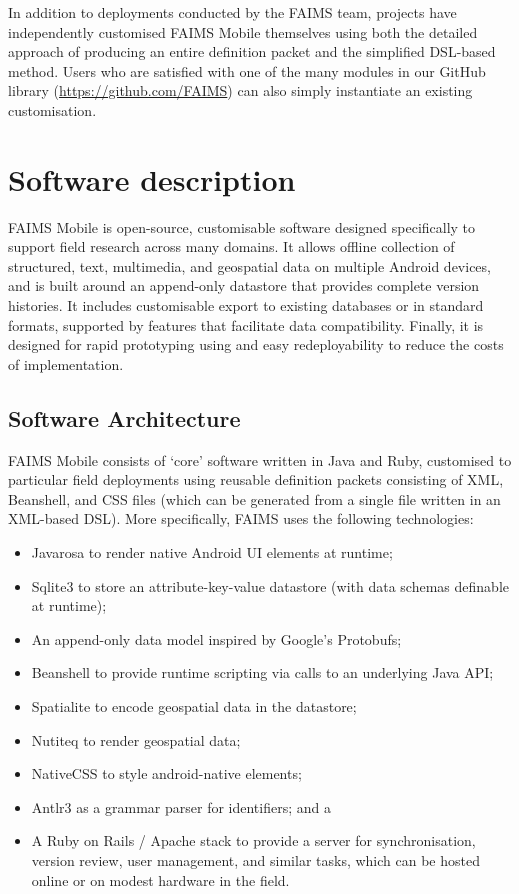 \documentclass[preprint,12pt, a4paper]{elsarticle}
\begin{document}
In addition to deployments conducted by the FAIMS team, projects have independently customised FAIMS Mobile themselves using both the detailed approach of producing an entire definition packet and the simplified DSL-based method\cite{Good2016-gf, Kiley2016-sf}. Users who are satisfied with one of the many modules in our GitHub library (\url{https://github.com/FAIMS}) can also simply instantiate an existing customisation.

\section{Software description}


FAIMS Mobile is open-source, customisable software designed specifically to support field research across many domains. It allows offline collection of structured, text, multimedia, and geospatial data on multiple Android devices, and is built around an append-only datastore that provides complete version histories. It includes customisable export to existing databases or in standard formats, supported by features that facilitate data compatibility. Finally, it is designed for rapid prototyping using and easy redeployability to reduce the costs of implementation. 


\subsection{Software Architecture}



FAIMS Mobile consists of `core' software written in Java and Ruby, customised to particular field deployments using reusable definition packets consisting of XML, Beanshell, and CSS files (which can be generated from a single file written in an XML-based DSL). More specifically, FAIMS uses the following technologies:

\begin{itemize}
\item Javarosa to render native Android UI elements at runtime;
\item Sqlite3 to store an attribute-key-value datastore (with data schemas definable at runtime);
\item An append-only data model inspired by Google's Protobufs;
\item Beanshell to provide runtime scripting via calls to an underlying Java API;
\item Spatialite to encode geospatial data in the datastore;
\item Nutiteq to render geospatial data;
\item NativeCSS to style android-native elements;
\item Antlr3 as a grammar parser for identifiers; and a
\item A Ruby on Rails / Apache stack to provide a server for synchronisation, version review, user management, and similar tasks, which can be hosted online or on modest hardware in the field.
\end{itemize}
\end{document}
